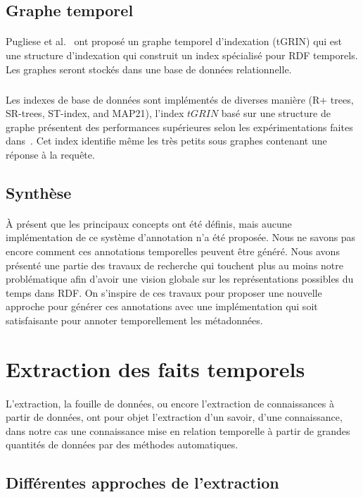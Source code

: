 \subsection{Graphe temporel}
\paragraph{}
Pugliese et al.~\cite{pugliese2008} ont proposé un graphe temporel d'indexation (tGRIN) qui est une structure d’indexation qui construit un index spécialisé pour RDF temporels. Les graphes seront stockés dans une base de données relationnelle.
\subparagraph{}
Les indexes de base de données sont implémentés de diverses manière (R+ trees, SR-trees, ST-index, and MAP21), l'index $tGRIN$ basé sur une structure de graphe présentent des performances supérieures selon les expérimentations faites dans~\cite{pugliese2008}. Cet index identifie même les très petits sous graphes contenant une réponse à la requête.
\subsection{Synthèse}
\paragraph{}
À présent que les principaux concepts ont été définis, mais aucune implémentation de ce système d'annotation n'a été proposée. Nous ne savons pas encore comment ces annotations temporelles peuvent être généré. Nous avons présenté une partie des travaux de recherche qui touchent plus au moins notre problématique afin d'avoir une vision globale sur les représentations possibles du temps dans RDF. On s'inspire de ces travaux pour proposer une nouvelle approche pour générer ces annotations avec une implémentation qui soit satisfaisante pour annoter temporellement les métadonnées.
\section{Extraction des faits temporels}
\paragraph{}
L'extraction, la fouille de données, ou encore l'extraction de connaissances à partir de données, ont pour objet l'extraction d'un savoir, d'une connaissance, dans notre cas une connaissance mise en relation temporelle à partir de grandes quantités de données par des méthodes automatiques.
\subsection{Différentes approches de l'extraction }
